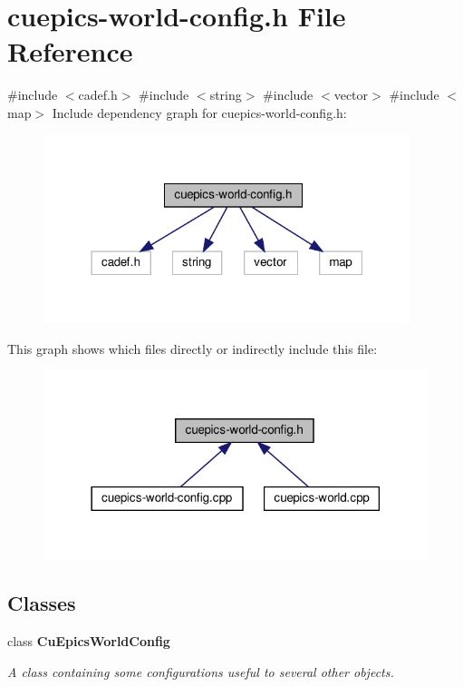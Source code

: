 \section{cuepics-\/world-\/config.h File Reference}
\label{cuepics-world-config_8h}
{\ttfamily \#include $<$cadef.\+h$>$}\newline
{\ttfamily \#include $<$string$>$}\newline
{\ttfamily \#include $<$vector$>$}\newline
{\ttfamily \#include $<$map$>$}\newline
Include dependency graph for cuepics-\/world-\/config.h\+:\nopagebreak
\begin{figure}[H]
\begin{center}
\leavevmode
\includegraphics[width=304pt]{cuepics-world-config_8h__incl}
\end{center}
\end{figure}
This graph shows which files directly or indirectly include this file\+:\nopagebreak
\begin{figure}[H]
\begin{center}
\leavevmode
\includegraphics[width=318pt]{cuepics-world-config_8h__dep__incl}
\end{center}
\end{figure}
\subsection*{Classes}
\begin{DoxyCompactItemize}
\item 
class \textbf{ Cu\+Epics\+World\+Config}
\begin{DoxyCompactList}\small\item\em A class containing some configurations useful to several other objects. \end{DoxyCompactList}\end{DoxyCompactItemize}
